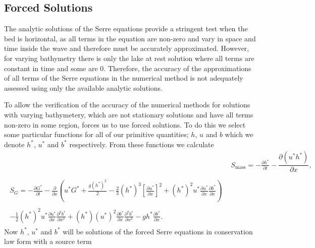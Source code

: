 \subsection{Forced Solutions}
The analytic solutions of the Serre equations provide a stringent test when the bed is horizontal, as all terms in the equation are non-zero and vary in space and time inside the wave and therefore must be accurately approximated. However, for varying bathymetry there is only the lake at rest solution where all terms are constant in time and some are $0$. Therefore, the accuracy of the approximations of all terms of the Serre equations in the numerical method is not adequately assessed using only the available analytic solutions.

To allow the verification of the accuracy of the numerical methods for solutions with varying bathymetery, which are not stationary solutions and have all terms non-zero in some region, forces us to use forced solutions. To do this we select some particular functions for all of our primitive quantities; $h$, $u$ and $b$ which we denote $h^*$, $u^*$ and $b^*$ respectively. From these functions we calculate 
\begin{align*}
&  S_{\text{mass}} = -\frac{\partial h^*}{\partial t} - \dfrac{\partial (u^*h^*)}{\partial x} ,  \\ \nonumber \\
\begin{split}
S_{G} = -\frac{\partial G^*}{\partial t}  - \frac{\partial}{\partial x} \left( {u}^* G^* + \frac{g\left(h^*\right)^2}{2} - \frac{2}{3}\left(h^*\right)^3 \left[\frac{\partial {u}^*}{\partial x}\right]^2 + \left(h^*\right)^2 {u^*}\frac{\partial {u}^*}{\partial x}\frac{\partial b^*}{\partial x} \right) \\ \\ - \frac{1}{2}\left(h^*\right)^2 {u}^* \frac{\partial {u}^*}{\partial x} \frac{\partial^2 b^*}{\partial x^2}  + \left(h^*\right) {\left(u^*\right)}^2\frac{\partial b^*}{\partial x}\frac{\partial^2 b^*}{\partial x^2} - gh^*\frac{\partial b^*}{\partial x}.
\end{split}
\end{align*} 
Now  $h^*$, $u^*$ and $b^*$ will be solutions of the forced Serre equations in conservation law form with a source term
